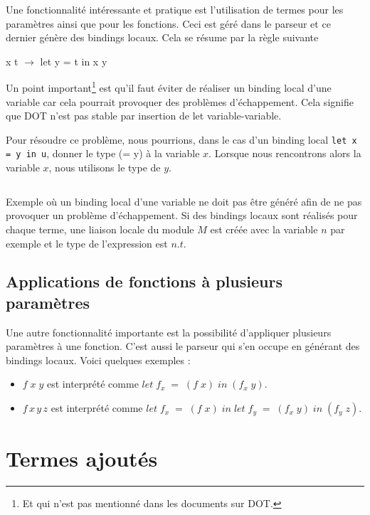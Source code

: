 Une fonctionnalité intéressante et pratique est l'utilisation de
termes pour les paramètres ainsi que pour les fonctions. Ceci
est géré dans le parseur et ce dernier génère des bindings locaux. Cela se
résume par la règle suivante

\begin{center}
  x t $\rightarrow$ let y = t in x y
\end{center}

Un point important\footnote{Et qui n'est pas mentionné dans les documents sur
DOT.} est qu'il faut éviter de réaliser un binding local d'une variable car
cela pourrait provoquer des problèmes d'échappement. Cela signifie que DOT n'est
pas stable par insertion de let variable-variable.

Pour résoudre ce problème, nous pourrions, dans le cas d'un binding local
\verb|let x = y in u|, donner le type (= y) à la variable $x$. Lorsque nous
rencontrons alors la variable $x$, nous utilisons le type de $y$.

\begin{listing}
  \label{code:implementation-grammar-terms-examples}
  \inputminted{OCaml}{codes/terms_binding_variable.rml}
  \caption{Exemple où un binding local d'une variable ne doit pas être généré
    afin de ne pas provoquer un problème d'échappement. Si des bindings locaux
    sont réalisés pour chaque terme, une liaison locale du module $M$ est
    créée avec la variable $n$ par exemple et le type de l'expression est $n.t$.}
\end{listing}

\subsection*{Applications de fonctions à plusieurs paramètres}

Une autre fonctionnalité importante est la possibilité d'appliquer plusieurs
paramètres à une fonction. C'est aussi le parseur qui s'en occupe en générant
des bindings locaux. Voici quelques exemples :

\begin{itemize}
\item $f \; x \; y$ est interprété comme $let \; f_{x} \; = \; (f \; x) \; in \;
  (f_{x} \; y)$.
\item $f \,  x \, y \, z$ est interprété comme $let \; f_{x} \; = \; (f \; x) \;
  in \; let \; f_{y} \; = \; (f_{x} \; y) \; in \; (f_{y} \; z)$.
\end{itemize}

\section{Termes ajoutés}

